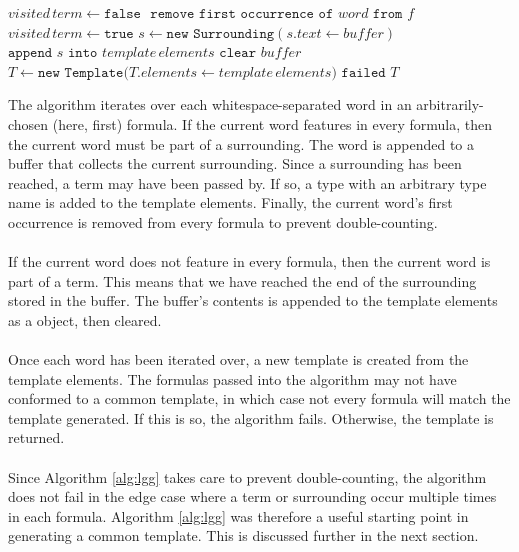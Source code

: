 \documentclass[../main.tex]{subfiles}
\begin{document}
{\begin{algorithm}
\begin{algorithmic}[1]
                \State $visited \, term \gets \texttt{false}$
            \EndIf
            \State $ $
                \State $\texttt{remove first occurrence of } word \texttt{ from } f$
            \EndFor
        \State $ $
        \Else 
            \State $visited \, term \gets \texttt{true}$
                \State $s \gets \texttt{new Surrounding}(s.text \gets buffer)$
                \State $\texttt{append } s \texttt{ into } template \, elements$
                \State $\texttt{clear } buffer$
            \EndIf
        \EndIf
    \EndFor
    \State $ $
    \State $T \gets \texttt{new Template(}T.elements \gets template \, elements)$
            \State \Return $\texttt{failed}$
        \EndIf
    \EndFor
    \State \Return $T$
\end{algorithmic}
\end{algorithm}
The algorithm iterates over each whitespace-separated word in an arbitrarily-chosen (here, first) formula. If the current word features in every formula, then the current word must be part of a surrounding. The word is appended to a buffer that collects the current surrounding. Since a surrounding has been reached, a term may have been passed by. If so, a type with an arbitrary type name is added to the template elements. Finally, the current word's first occurrence is removed from every formula to prevent double-counting. 
\\
\\
If the current word does not feature in every formula, then the current word is part of a term. This means that we have reached the end of the surrounding stored in the buffer. The buffer's contents is appended to the template elements as a  object, then cleared.
\\
\\
Once each word has been iterated over, a new template is created from the template elements. The formulas passed into the algorithm may not have conformed to a common template, in which case not every formula will match the template generated. If this is so, the algorithm fails. Otherwise, the template is returned.
\\
\\
Since Algorithm \ref{alg:lgg} takes care to prevent double-counting, the algorithm does not fail in the edge case where a term or surrounding occur multiple times in each formula. Algorithm \ref{alg:lgg} was therefore a useful starting point in generating a common template. This is discussed further in the next section.

}
\end{document}
